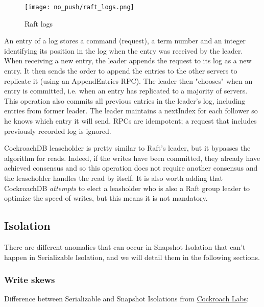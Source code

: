 \begin{figure}[H]
  \vspace{-10pt}
  \centering
  \centerline{\texttt{[image: no\_push/raft\_logs.png]}}
  \vspace{-5pt}
  \caption{Raft logs\cite{DBLP:conf/usenix/OngaroO14}}
  \vspace{-5pt}
  \label{fig:raft-log}
\end{figure}


An entry of a log stores a command (request), a term number and an integer identifying its position in the log when the entry was received by the leader. When receiving a new entry, the leader appends the request to its log as a new entry. It then sends the order to append the entries to the other servers to replicate it (using an AppendEntries RPC). The leader then "chooses" when an entry is committed, i.e. when an entry has replicated to a majority of servers. This operation also commits all previous entries in the leader's log, including entries from former leader. The leader maintains a nextIndex for each follower so he knows which entry it will send. RPCs are idempotent; a request that includes previously recorded log is ignored.


CockroachDB leaseholder is pretty similar to Raft's leader, but it bypasses the algorithm for reads. Indeed, if the writes have been committed, they already have achieved consensus and so this operation does not require another consensus and the leaseholder handles the read by itself. It is also worth adding that CockroachDB \emph{attempts} to elect a leasholder who is also a Raft group leader to optimize the speed of writes, but this means it is not mandatory\cite{CRDB:replication-layer}.

\label{sec:isolation}
\subsection{Isolation}


There are different anomalies that can occur in Snapshot Isolation that can't happen in Serializable Isolation, and we will detail them in the following sections.

\subsubsection{Write skews}


Difference between Serializable and Snapshot Isolations from \href{https://www.cockroachlabs.com/blog/what-write-skew-looks-like/}{Cockroach Labs}:


